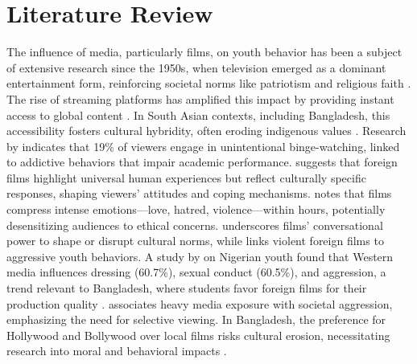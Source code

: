 \documentclass[12pt]{article}
\begin{document}
\section{Literature Review}
The influence of media, particularly films, on youth behavior has been a subject of extensive research since the 1950s, when television emerged as a dominant entertainment form, reinforcing societal norms like patriotism and religious faith \cite{khan_academy_1950s}. The rise of streaming platforms has amplified this impact by providing instant access to global content \cite{pittman2015}. In South Asian contexts, including Bangladesh, this accessibility fosters cultural hybridity, often eroding indigenous values \cite{ndimele2004}. Research by \cite{riddle2017} indicates that 19\% of viewers engage in unintentional binge-watching, linked to addictive behaviors that impair academic performance. \cite{ali2019} suggests that foreign films highlight universal human experiences but reflect culturally specific responses, shaping viewers’ attitudes and coping mechanisms. \cite{muthu2021} notes that films compress intense emotions—love, hatred, violence—within hours, potentially desensitizing audiences to ethical concerns. \cite{aldana2004} underscores films’ conversational power to shape or disrupt cultural norms, while \cite{raji2020} links violent foreign films to aggressive youth behaviors. A study by \cite{johnson2016} on Nigerian youth found that Western media influences dressing (60.7\%), sexual conduct (60.5\%), and aggression, a trend relevant to Bangladesh, where students favor foreign films for their production quality \cite{brown2014}. \cite{meltzoff1977} associates heavy media exposure with societal aggression, emphasizing the need for selective viewing. In Bangladesh, the preference for Hollywood and Bollywood over local films risks cultural erosion, necessitating research into moral and behavioral impacts \cite{kubay1990}.

\end{document}
